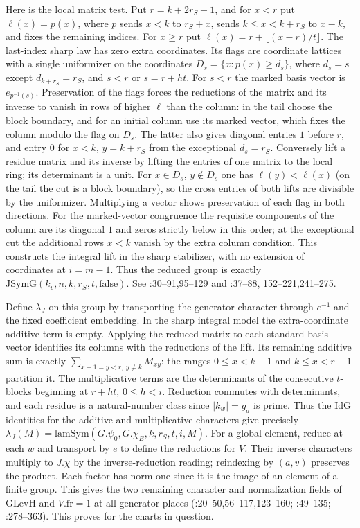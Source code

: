 Here is the local matrix test. Put $r=k+2r_S+1$, and for $x<r$ put
$\ell(x)=p(x)$, where $p$ sends $x<k$ to $r_S+x$, sends
$k\le x<k+r_S$ to $x-k$, and fixes the remaining indices.
For $x\ge r$ put $\ell(x)=r+\lfloor(x-r)/t\rfloor$.
The last-index sharp law has zero extra coordinates. Its flags are
coordinate lattices with a single uniformizer on the coordinates
$D_s=\{x:p(x)\ge d_s\}$, where $d_s=s$ except
$d_{k+r_S}=r_S$, and $s<r$ or $s=r+ht$. For $s<r$ the marked
basis vector is $e_{p^{-1}(s)}$. Preservation of the flags forces the
reductions of the matrix and its inverse to vanish in rows of higher
$\ell$ than the column: in the tail choose the block boundary,
and for an initial column use its marked vector, which fixes the
column modulo the flag on $D_s$. The latter also gives diagonal
entries $1$ before $r$, and entry $0$ for $x<k$, $y=k+r_S$ from the
exceptional $d_s=r_S$. Conversely lift a residue matrix and its
inverse by lifting the entries of one matrix to the local ring;
its determinant is a unit. For $x\in D_s$, $y\notin D_s$ one has
$\ell(y)<\ell(x)$ (on the tail the cut is a block boundary), so
the cross entries of both lifts are divisible by the uniformizer.
Multiplying a vector shows preservation of each flag in both directions.
For the marked-vector congruence the requisite components of the
column are its diagonal $1$ and zeros strictly below in this order;
at the exceptional cut the additional rows $x<k$ vanish by the
extra column condition. This constructs the integral lift in the
sharp stabilizer, with no extension of coordinates at $i=m-1$.
Thus the reduced group is exactly $\mathrm{JSymG}(k_v,n,k,r_S,t,
\mathrm{false})$. See :30--91,95--129
and :37--88,
152--221,241--275.

Define $\lambda_J$ on this group by transporting the generator
character through $e^{-1}$ and the fixed coefficient embedding. In the
sharp integral model the extra-coordinate additive term is empty.
Applying the reduced matrix to each standard basis vector identifies
its columns with the reductions of the lift. Its remaining additive
sum is exactly $\sum_{x+1=y<r,\ y\ne k} M_{xy}$: the ranges
$0\le x<k-1$ and $k\le x<r-1$ partition it. The multiplicative
terms are the determinants of the consecutive $t$-blocks beginning
at $r+ht$, $0\le h<i$. Reduction commutes with determinants, and
each residue is a natural-number class since $|k_w|=g_a$ is prime.
Thus the $\mathrm{IdG}$ identities for the additive and
multiplicative characters give precisely
$\lambda_J(M)=\mathrm{lamSym}(G.\psi_0,G.\chi_B,k,r_S,t,i,M)$.
For a global element, reduce at each $w$ and transport by $e$ to
define the reductions for $V$. Their inverse characters multiply to
$J.\chi$ by the inverse-reduction reading; reindexing by $(a,v)$
preserves the product. Each factor has norm one since it is the
image of an element of a finite group. This gives the two remaining
character and normalization fields of $\mathrm{GLevH}$ and
$V.\mathrm{fr}=1$ at all generator places
(:20--50,56--117,123--160;
:49--135;
:278--363). This proves
 for
the charts in question.

